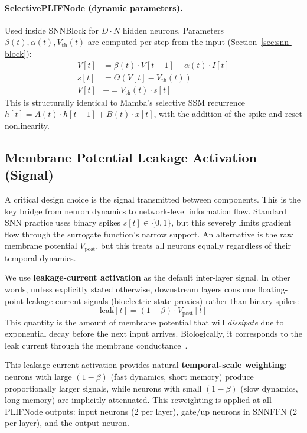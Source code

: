\documentclass{article}
\newcommand{\vpost}{V_{\text{post}}}
\newcommand{\vth}{V_{\text{th}}}
\begin{document}
\paragraph{SelectivePLIFNode (dynamic parameters).}
Used inside SNNBlock for $D \cdot N$ hidden neurons.
Parameters $\beta(t), \alpha(t), \vth(t)$ are computed per-step from the input (Section~\ref{sec:snn-block}):
\begin{align}
    V[t] &= \beta(t) \cdot V[t-1] + \alpha(t) \cdot I[t] \label{eq:selective-charge} \\
    s[t] &= \Theta(V[t] - \vth(t)) \label{eq:selective-fire} \\
    V[t] &\mathrel{-}= \vth(t) \cdot s[t] \label{eq:selective-reset}
\end{align}
This is structurally identical to Mamba's selective SSM recurrence $h[t] = \bar{A}(t) \cdot h[t-1] + \bar{B}(t) \cdot x[t]$, with the addition of the spike-and-reset nonlinearity.

\subsection{Membrane Potential Leakage Activation (Signal)}
\label{sec:leakage}

A critical design choice is the signal transmitted between components. This is the key bridge from neuron dynamics to network-level information flow.
Standard SNN practice uses binary spikes $s[t] \in \{0,1\}$, but this severely limits gradient flow through the surrogate function's narrow support.
An alternative is the raw membrane potential $\vpost$, but this treats all neurons equally regardless of their temporal dynamics.

We use \textbf{leakage-current activation} as the default inter-layer signal. In other words, unless explicitly stated otherwise, downstream layers consume floating-point leakage-current signals (bioelectric-state proxies) rather than binary spikes:
\begin{equation}
    \text{leak}[t] = (1 - \beta) \cdot \vpost[t]
    \label{eq:leakage}
\end{equation}
This quantity is the amount of membrane potential that will \emph{dissipate} due to exponential decay before the next input arrives.
Biologically, it corresponds to the leak current through the membrane conductance~\citep{hodgkin1952quantitative, abbott1999lapicque}.

This leakage-current activation provides natural \textbf{temporal-scale weighting}:
neurons with large $(1-\beta)$ (fast dynamics, short memory) produce proportionally larger signals,
while neurons with small $(1-\beta)$ (slow dynamics, long memory) are implicitly attenuated.
This reweighting is applied at all PLIFNode outputs: input neurons (2 per layer), gate/up neurons in SNNFFN (2 per layer), and the output neuron.
\end{document}
